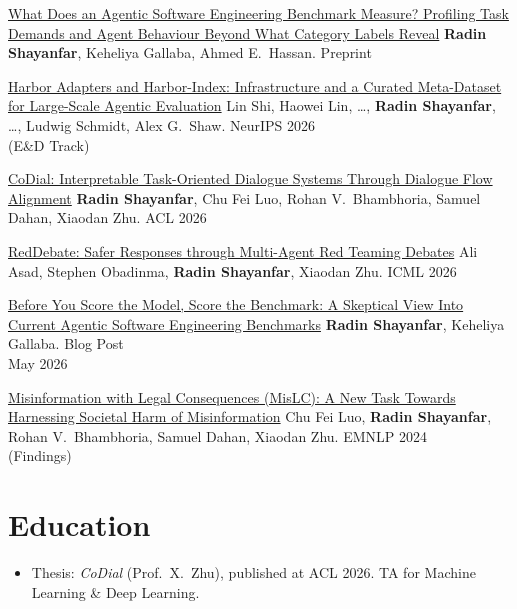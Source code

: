 \documentclass[11pt,letterpaper]{article}
\begin{document}
\pubentry
  {\href{https://arxiv.org/abs/2609.01271}{What Does an Agentic Software Engineering Benchmark Measure? Profiling Task Demands and Agent Behaviour Beyond What Category Labels Reveal}}
  {\textbf{Radin Shayanfar}, Keheliya Gallaba, Ahmed E.\ Hassan.}
  {Preprint}

\pubentry
  {\href{https://arxiv.org/abs/2609.04298}{Harbor Adapters and Harbor-Index: Infrastructure and a Curated Meta-Dataset for Large-Scale Agentic Evaluation}}
  {Lin Shi, Haowei Lin, \ldots, \textbf{Radin Shayanfar}, \ldots, Ludwig Schmidt, Alex G.\ Shaw.}
  {NeurIPS 2026\\(E\&D Track)}

\pubentry%
  {\href{https://aclanthology.org/2026.acl-long.1980/}{CoDial: Interpretable Task-Oriented Dialogue Systems Through Dialogue Flow Alignment}}
  {\textbf{Radin Shayanfar}, Chu Fei Luo, Rohan V.\ Bhambhoria, Samuel Dahan, Xiaodan Zhu.}
  {ACL 2026}

\pubentry
  {\href{https://openreview.net/forum?id=79fSrxFKKx}{RedDebate: Safer Responses through Multi-Agent Red Teaming Debates}}
  {Ali Asad, Stephen Obadinma, \textbf{Radin Shayanfar}, Xiaodan Zhu.}
  {ICML 2026}

\pubentry
  {\href{https://centre-for-software-excellence.github.io/docs/blog/before-you-score-the-model-score-the-benchmark}{Before You Score the Model, Score the Benchmark: A Skeptical View Into Current Agentic Software Engineering Benchmarks}}
  {\textbf{Radin Shayanfar}, Keheliya Gallaba.}
  {Blog Post\\May 2026}

\pubentry
  {\href{https://aclanthology.org/2024.findings-emnlp.924/}{Misinformation with Legal Consequences (MisLC): A New Task Towards Harnessing Societal Harm of Misinformation}}
  {Chu Fei Luo, \textbf{Radin Shayanfar}, Rohan V.\ Bhambhoria, Samuel Dahan, Xiaodan Zhu.}
  {EMNLP 2024\\(Findings)}

\section*{Education}

\begin{itemize}
  \item Thesis: \textit{CoDial} (Prof.\ X.\ Zhu), published at ACL 2026. TA for Machine Learning \& Deep Learning.
\end{itemize}

\end{document}
